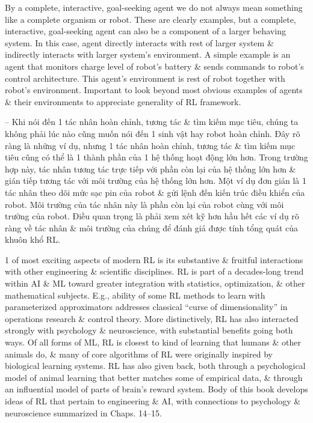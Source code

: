 \documentclass{article}
\begin{document}
\begin{itemize}
\begin{itemize}
        By a complete, interactive, goal-seeking agent we do not always mean something like a complete organism or robot. These are clearly examples, but a complete, interactive, goal-seeking agent can also be a component of a larger behaving system. In this case, agent directly interacts with rest of larger system \& indirectly interacts with larger system's environment. A simple example is an agent that monitors charge level of robot's battery \& sends commands to robot's control architecture. This agent's environment is rest of robot together with robot's environment. Important to look beyond most obvious examples of agents \& their environments to appreciate generality of RL framework.

        -- Khi nói đến 1 tác nhân hoàn chỉnh, tương tác \& tìm kiếm mục tiêu, chúng ta không phải lúc nào cũng muốn nói đến 1 sinh vật hay robot hoàn chỉnh. Đây rõ ràng là những ví dụ, nhưng 1 tác nhân hoàn chỉnh, tương tác \& tìm kiếm mục tiêu cũng có thể là 1 thành phần của 1 hệ thống hoạt động lớn hơn. Trong trường hợp này, tác nhân tương tác trực tiếp với phần còn lại của hệ thống lớn hơn \& gián tiếp tương tác với môi trường của hệ thống lớn hơn. Một ví dụ đơn giản là 1 tác nhân theo dõi mức sạc pin của robot \& gửi lệnh đến kiến trúc điều khiển của robot. Môi trường của tác nhân này là phần còn lại của robot cùng với môi trường của robot. Điều quan trọng là phải xem xét kỹ hơn hầu hết các ví dụ rõ ràng về tác nhân \& môi trường của chúng để đánh giá được tính tổng quát của khuôn khổ RL.

        1 of most exciting aspects of modern RL is its substantive \& fruitful interactions with other engineering \& scientific disciplines. RL is part of a decades-long trend within AI \& ML toward greater integration with statistics, optimization, \& other mathematical subjects. E.g., ability of some RL methods to learn with parameterized approximators addresses classical ``curse of dimensionality'' in operations research \& control theory. More distinctively, RL has also interacted strongly with psychology \& neuroscience, with substantial benefits going both ways. Of all forms of ML, RL is closest to kind of learning that humans \& other animals do, \& many of core algorithms of RL were originally inspired by biological learning systems. RL has also given back, both through a psychological model of animal learning that better matches some of empirical data, \& through an influential model of parts of brain's reward system. Body of this book develops ideas of RL that pertain to engineering \& AI, with connections to psychology \& neuroscience summarized in Chaps. 14--15.


\end{itemize}
\end{itemize}
\end{document}
